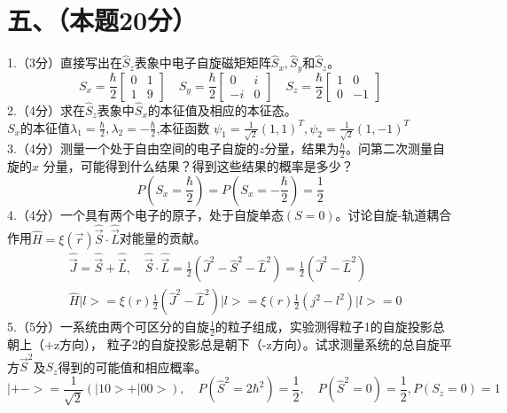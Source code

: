 \documentclass[UTF8]{ctexart}
\begin{document}
\section*{五、（本题20分）}
1.（3分）直接写出在$\hat S_z$表象中电子自旋磁矩矩阵$\hat S_x,\hat S_y$和$\hat S_z$。\\
\begin{equation*}
  S_x=\frac{\hbar}{2}
  \begin{bmatrix}
    0 & 1 \\
    1 & 9
  \end{bmatrix}\quad
  S_y=\frac{\hbar}{2}
  \begin{bmatrix}
    0  & i \\
    -i & 0
  \end{bmatrix}\quad
  S_z=\frac{\hbar}{2}
  \begin{bmatrix}
    1 & 0  \\
    0 & -1
  \end{bmatrix}
\end{equation*}
2.（4分）求在$\hat S_z$表象中$\hat S_x$的本征值及相应的本征态。\\
$S_x$的本征值$\lambda_1=\frac{\hbar}{2},\lambda_2=-\frac{\hbar}{2}$,本征函数
$\psi_1=\frac{1}{\sqrt2}(1,1)^T,\psi_2=\frac{1}{\sqrt2}(1,-1)^T$\\
3.（4分）测量一个处于自由空间的电子自旋的$z$分量，结果为$\frac{\hbar}{2}$。问第二次测量自旋的$x$
分量，可能得到什么结果？得到这些结果的概率是多少？\\
\begin{equation*}
  P(S_x=\frac{\hbar}{2})=P(S_x=-\frac{\hbar}{2})=\frac{1}{2}
\end{equation*}
4.（4分）一个具有两个电子的原子，处于自旋单态$(S=0)$。讨论自旋-轨道耦合作用$\hat H=\xi(\vec r)
  \hat\vec S\cdot\hat\vec L$对能量的贡献。\\
\begin{equation*}
  \begin{aligned}
     & \hat{\vec J}=\hat{\vec S}+\hat{\vec L},\quad\hat{\vec S}\cdot\hat{\vec L}=\frac{1}{2}
    (\hat J^2-\hat S^2-\hat L^2)=\frac{1}{2}(\hat J^2-\hat L^2)                              \\
     & \hat H\lvert l>=\xi(r)\frac{1}{2}(\hat J^2-\hat L^2)\lvert l>
    =\xi(r)\frac{1}{2}(j^2-l^2)\lvert l>=0
  \end{aligned}
\end{equation*}
5.（5分）一系统由两个可区分的自旋$\frac{1}{2}$的粒子组成，实验测得粒子1的自旋投影总朝上（+z方向），
粒子2的自旋投影总是朝下（-z方向）。试求测量系统的总自旋平方$\vec S^2$及$S_z$得到的可能值和相应概率。
\begin{equation*}
  \lvert +->=\frac{1}{\sqrt2}(\lvert10>+\lvert00>),\quad
  P(\hat S^2=2\hbar^2)=\frac{1}{2},\quad P(\hat S^2=0)=\frac{1}{2},P(S_z=0)=1
\end{equation*}
\end{document}
